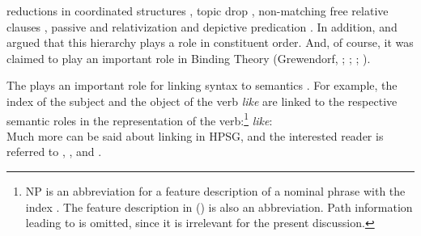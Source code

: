 \documentclass[output=paper,biblatex,babelshorthands,newtxmath,draftmode,colorlinks,citecolor=brown]{langscibook}
\begin{document}
reductions in coordinated structures \citep[]{Klein85},
topic drop \citep{Fries88b},
non-matching free relative clauses 
\parencites[Section~3]{Bausewein90}[]{Pittner95b}[--62]{Mueller99b}, 
passive and relativization \citep[, 68]{KC77a} and
depictive predication \citep[Section~2]{Mueller2008a}.
In addition, \citet{Pullum77a} and \citet[]{ps} argued that this hierarchy plays a role in
constituent order.
And, of course, it was claimed to play an important role in Binding Theory 
(Grewendorf, \citeyear[]{Grewendorf83a}; \citeyear[]{Grewendorf85a}; \citeyear[]{Grewendorf88a}; \citealp[Chapter~6]{ps2}).

The \argstl plays an important role for linking syntax to semantics . For example, the index of the
subject and the object of the verb \emph{like} are linked to the respective semantic roles in the
representation of the verb:\footnote{%
  NP is an abbreviation for a feature description of a nominal phrase with the index . The feature description in () is also an
  abbreviation. Path information leading to \cont is omitted, since it is irrelevant for the present
  discussion.
%
}
\eas
\label{ex-like}
\emph{like}:\\
\zs 
Much more can be said about linking in HPSG, and the interested reader is referred to
, ,  and .
\end{document}
